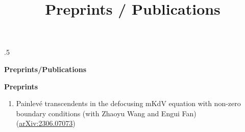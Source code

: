 \documentclass[letterpaper,11pt,UTF8]{article}
\title{Preprints / Publications}
\begin{document}


\moveleft.5\hoffset\centerline{\LARGE\bf Preprints/Publications} %
\center
\large\textbf{Preprints}
\begin{flushleft}
    \begin{enumerate}[1.]
   \item Painlev\'{e} transcendents in the defocusing mKdV equation with non-zero boundary conditions (with Zhaoyu Wang and Engui Fan)\\
    (\href{https://arxiv.org/abs/2306.07073}{arXiv:2306.07073})
    \end{enumerate}
\end{flushleft}
\vspace{3mm}
\end{document}
